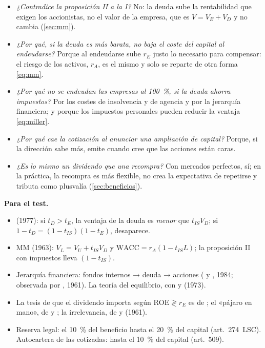 \documentclass[11pt]{article}
\begin{document}
\begin{itemize}
\item \emph{¿Contradice la proposición II a la I?} No: la deuda sube la rentabilidad que exigen los accionistas, no el valor de la empresa, que es $V=V_E+V_D$ y no cambia (\ref{sec:mm}).
\item \emph{¿Por qué, si la deuda es más barata, no baja el coste del capital al endeudarse?} Porque al endeudarse sube $r_E$ justo lo necesario para compensar: el riesgo de los activos, $r_A$, es el mismo y solo se reparte de otra forma \eqref{eq:mm}.
\item \emph{¿Por qué no se endeudan las empresas al 100~\%, si la deuda ahorra impuestos?} Por los costes de insolvencia y de agencia y por la jerarquía financiera; y porque los impuestos personales pueden reducir la ventaja \eqref{eq:miller}.
\item \emph{¿Por qué cae la cotización al anunciar una ampliación de capital?} Porque, si la dirección sabe más, emite cuando cree que las acciones están caras\nocite{MyersMajluf1984Corporate}.
\item \emph{¿Es lo mismo un dividendo que una recompra?} Con mercados perfectos, sí; en la práctica, la recompra es más flexible, no crea la expectativa de repetirse y tributa como plusvalía (\ref{sec:beneficios}).
\end{itemize}

\begin{anotaciones}
\textbf{Para el test.}
\begin{itemize}
\item {} (1977): si $t_D>t_E$, la ventaja de la deuda es \emph{menor} que $t_{IS}V_D$; si $1-t_D=(1-t_{IS})(1-t_E)$, desaparece.
\item MM (1963): $V_L=V_U+t_{IS}V_D$ y $\mathrm{WACC}=r_A(1-t_{IS}L)$; la proposición II con impuestos lleva $(1-t_{IS})$.
\item Jerarquía financiera: fondos internos → deuda → acciones ( y , 1984; observada por , 1961). La teoría del equilibrio, con  y  (1973).
\item La tesis de que el dividendo importa según $\mathrm{ROE}\gtrless r_E$ es de ; el «pájaro en mano», de  y ; la irrelevancia, de  y  (1961).
\item Reserva legal: el 10~\% del beneficio hasta el 20~\% del capital (art.~274~LSC). Autocartera de las cotizadas: hasta el 10~\% del capital (art.~509).
\end{itemize}
\end{anotaciones}
\end{document}

